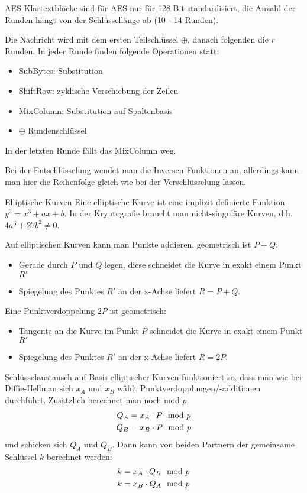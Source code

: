\documentclass{article}
\begin{document}
	\begin{exkurs}{AES}
		Klartextblöcke sind für AES nur für 128 Bit standardisiert, die Anzahl der Runden hängt von der Schlüssellänge ab (10 - 14 Runden).
		
		Die Nachricht wird mit dem ersten Teilschlüssel $\oplus$, danach folgenden die $r$ Runden. In jeder Runde finden folgende Operationen statt:
		\begin{itemize}
			\item SubBytes: Substitution
			\item ShiftRow: zyklische Verschiebung der Zeilen
			\item MixColumn: Substitution auf Spaltenbasis
			\item $\oplus$ Rundenschlüssel
		\end{itemize}
		In der letzten Runde fällt das MixColumn weg.
		
		Bei der Entschlüsselung wendet man die Inversen Funktionen an, allerdings kann man hier die Reihenfolge gleich wie bei der Verschlüsselung lassen.
	\end{exkurs}

	\begin{exkurs}{Elliptische Kurven}
		Eine elliptische Kurve ist eine implizit definierte Funktion $y^2 = x^3 + ax + b$. In der Kryptografie braucht man nicht-singuläre Kurven, d.h. $4a^3 + 27b^2 \neq 0$.
		
		Auf elliptischen Kurven kann man Punkte addieren, geometrisch ist $P+Q$:
		\begin{itemize}
			\item Gerade durch $P$ und $Q$ legen, diese schneidet die Kurve in exakt einem Punkt $R'$
			\item Spiegelung des Punktes $R'$ an der x-Achse liefert $R = P + Q$.
		\end{itemize}
		Eine Punktverdoppelung $2P$ ist geometrisch:
		\begin{itemize}
			\item Tangente an die Kurve im Punkt $P$ schneidet die Kurve in exakt einem Punkt $R'$
			\item Spiegelung des Punktes $R'$ an der x-Achse liefert $R = 2P$.
		\end{itemize}
	
		Schlüsselaustausch auf Basis elliptischer Kurven funktioniert so, dass man wie bei Diffie-Hellman sich $x_A$ und $x_B$ wählt Punktverdopplungen/-additionen durchführt. Zusätzlich berechnet man noch mod $p$.
		\begin{align}
			Q_A &= x_A\cdot P \mod p \notag \\
			Q_B &= x_B\cdot P \mod p \notag
		\end{align}
		und schicken sich $Q_A$ und $Q_B$. Dann kann von beiden Partnern der gemeinsame Schlüssel $k$ berechnet werden:
		\begin{align}
			k &= x_A\cdot Q_B \mod p \notag \\
			k &= x_B\cdot Q_A \mod p \notag
		\end{align}
	\end{exkurs}
	
\end{document}
